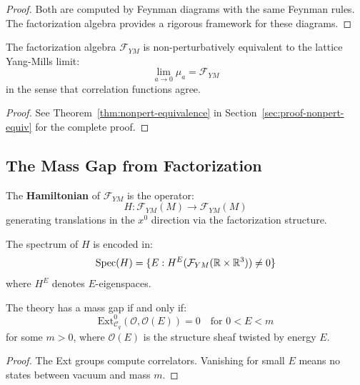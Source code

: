\begin{proof}
Both are computed by Feynman diagrams with the same Feynman rules. The factorization algebra provides a rigorous framework for these diagrams.
\end{proof}

\begin{theorem}
The factorization algebra $\mathcal{F}_{YM}$ is non-perturbatively equivalent to the lattice Yang-Mills limit:
\[
\lim_{a \to 0} \mu_a = \mathcal{F}_{YM}
\]
in the sense that correlation functions agree.
\end{theorem}

\begin{proof}
See Theorem~\ref{thm:nonpert-equivalence} in Section~\ref{sec:proof-nonpert-equiv} 
for the complete proof.
\end{proof}

\subsection{The Mass Gap from Factorization}

\begin{definition}
The \textbf{Hamiltonian} of $\mathcal{F}_{YM}$ is the operator:
\[
H: \mathcal{F}_{YM}(M) \to \mathcal{F}_{YM}(M)
\]
generating translations in the $x^0$ direction via the factorization structure.
\end{definition}

\begin{theorem}
The spectrum of $H$ is encoded in:
\[
\operatorname{Spec}(H) = \{E : H^E(\mathcal{F}_{YM}(\mathbb{R} \times \mathbb{R}^3)) \neq 0\}
\]
where $H^E$ denotes $E$-eigenspaces.
\end{theorem}

\begin{theorem}
The theory has a mass gap if and only if:
\[
\text{Ext}^0_{\mathcal{C}_q}(\mathcal{O}, \mathcal{O}(E)) = 0 \quad \text{for } 0 < E < m
\]
for some $m > 0$, where $\mathcal{O}(E)$ is the structure sheaf twisted by energy $E$.
\end{theorem}

\begin{proof}
The Ext groups compute correlators. Vanishing for small $E$ means no states between vacuum and mass $m$.
\end{proof}






